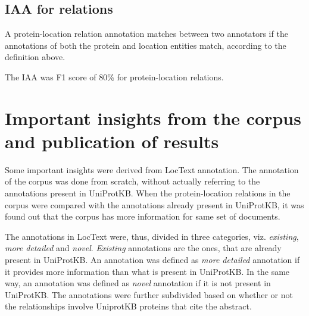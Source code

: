 \subsection*{IAA for relations}

A protein-location relation annotation matches between two annotators if the annotations of both the protein and location entities match, according to the definition above.

The IAA was F1 score of 80\% for protein-location relations.

\section{Important insights from the corpus and publication of results}

Some important insights were derived from LocText annotation. The annotation of the corpus was done from scratch, without actually referring to the annotations present in UniProtKB. When the protein-location relations in the corpus were compared with the annotations already present in UniProtKB, it was found out that the corpus has more information for same set of documents.

The annotations in LocText were, thus, divided in three categories, viz. \textit{existing}, \textit{more detailed} and \textit{novel}. \textit{Existing} annotations are the ones, that are already present in UniProtKB. An annotation was defined as \textit{more detailed} annotation if it provides more information than what is present in UniProtKB. In the same way, an annotation was defined as \textit{novel} annotation if it is not present in UniProtKB. The annotations were further subdivided based on whether or not the relationships involve UniprotKB proteins that cite the abstract.

